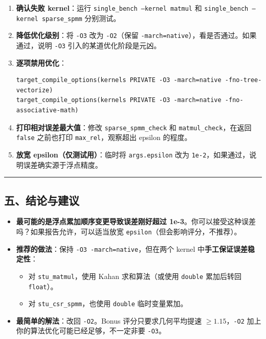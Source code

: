 \documentclass[11pt, a4paper]{article}
\begin{document}
\begin{aibox}
\begin{enumerate}
    \item \textbf{确认失败 kernel}：运行 \texttt{single\_bench --kernel matmul} 和 \texttt{single\_bench --kernel sparse\_spmm} 分别测试。
    \item \textbf{降低优化级别}：将 \texttt{-O3} 改为 \texttt{-O2}（保留 \texttt{-march=native}），看是否通过。如果通过，说明 \texttt{-O3} 引入的某道优化阶段是元凶。
    \item \textbf{逐项禁用优化}：
\begin{tcolorbox}[colback=white,colframe=gray!50!white,boxrule=0.5pt,arc=2pt,left=5pt,right=5pt,top=5pt,bottom=5pt]
\begin{verbatim}
target_compile_options(kernels PRIVATE -O3 -march=native -fno-tree-vectorize)
target_compile_options(kernels PRIVATE -O3 -march=native -fno-associative-math)
\end{verbatim}
\end{tcolorbox}
    \item \textbf{打印相对误差最大值}：修改 \texttt{sparse\_spmm\_check} 和 \texttt{matmul\_check}，在返回 \texttt{false} 之前也打印 \texttt{max\_rel}，观察超出 epsilon 的程度。
    \item \textbf{放宽 epsilon（仅测试用）}：临时将 \texttt{args.epsilon} 改为 \texttt{1e-2}，如果通过，说明误差确实源于浮点精度。
\end{enumerate}

\begin{center}\rule{\textwidth}{0.4pt}\end{center}

\subsection*{五、结论与建议}

\begin{itemize}
    \item \textbf{最可能的是浮点累加顺序变更导致误差刚好超过 1e-3}。你可以接受这种误差吗？如果报告允许，可以适当放宽 \texttt{epsilon}（但会影响评分，不推荐）。
    \item \textbf{推荐的做法}：保持 \texttt{-O3 -march=native}，但在两个 kernel 中\textbf{手工保证误差稳定性}：
    \begin{itemize}
        \item 对 \texttt{stu\_matmul}，使用 Kahan 求和算法（或使用 \texttt{double} 累加后转回 \texttt{float}）。
        \item 对 \texttt{stu\_csr\_spmm}，也使用 \texttt{double} 临时变量累加。
    \end{itemize}
    \item \textbf{最简单的解法}：改回 \texttt{-O2}。Bonus 评分只要求几何平均提速 $\ge 1.15$，\texttt{-O2} 加上你的算法优化可能已经足够，不一定非要 \texttt{-O3}。
\end{itemize}


\end{aibox}
\end{document}
